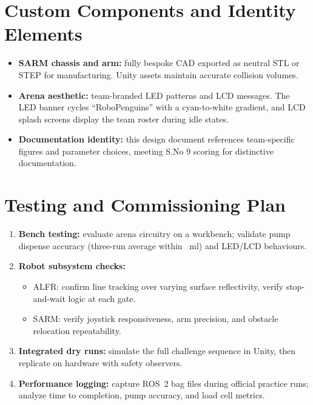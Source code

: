 \documentclass[12pt]{article}
\begin{document}
\section{Custom Components and Identity Elements}\label{sec:custom}
\begin{itemize}
    \item \textbf{SARM chassis and arm:} fully bespoke CAD exported as neutral STL or STEP for manufacturing. Unity assets maintain accurate collision volumes.
    \item \textbf{Arena aesthetic:} team-branded LED patterns and LCD messages. The LED banner cycles ``RoboPenguins'' with a cyan-to-white gradient, and LCD splash screens display the team roster during idle states.
    \item \textbf{Documentation identity:} this design document references team-specific figures and parameter choices, meeting S.No 9 scoring for distinctive documentation.
\end{itemize}

\section{Testing and Commissioning Plan}\label{sec:testing}
\begin{enumerate}
    \item \textbf{Bench testing:} evaluate arena circuitry on a workbench; validate pump dispense accuracy (three-run average within ~ml) and LED/LCD behaviours.
    \item \textbf{Robot subsystem checks:}
    \begin{itemize}
        \item ALFR: confirm line tracking over varying surface reflectivity, verify stop-and-wait logic at each gate.
        \item SARM: verify joystick responsiveness, arm precision, and obstacle relocation repeatability.
    \end{itemize}
    \item \textbf{Integrated dry runs:} simulate the full challenge sequence in Unity, then replicate on hardware with safety observers.
    \item \textbf{Performance logging:} capture ROS~2 bag files during official practice runs; analyze time to completion, pump accuracy, and load cell metrics.
\end{enumerate}
\end{document}
